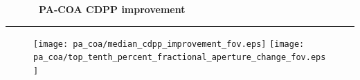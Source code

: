 \cleardoublepage
\begin{figure}[h!]
  \centering
  \hfill
  {\Huge {\bf \quarter\ PA-COA CDPP improvement}}
  \hfill
\end{figure}
\hrule

\begin{figure}[h!]
  \centering
  \texttt{[image: pa\_coa/median\_cdpp\_improvement\_fov.eps]}
  \texttt{[image: pa\_coa/top\_tenth\_percent\_fractional\_aperture\_change\_fov.eps]}
\end{figure}



